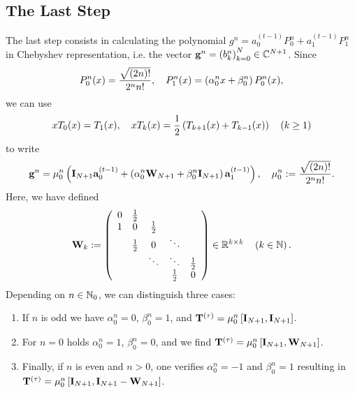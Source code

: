 \subsection{The Last Step}
\label{NFSFT:LinearAlgebra:LastStep}
The last step consists in calculating the polynomial $g^{n} = a_{0}^{(t-1)} P_{0}^{n} + a_{1}^{(t-1)} P_{1}^{n}$ in 
Chebyshev representation, i.e. the vector $\mathbf{g}^{n} = \left(b_{k}^n\right)_{k=0}^{N} \in \mathbb{C}^{N+1}$. Since 
\[
  P_{0}^n{\hspace{-0.4ex}}\left(x\right) = \frac{\sqrt{(2n)!}}{2^n n!},\quad P_{1}^n{\hspace{-0.4ex}}\left(x\right) = \left(\alpha_{0}^n x + \beta_{0}^n\right)P_{0}^n(x),
\] 
we can use 
\[
  xT_{0}(x) = T_{1}(x),\quad xT_{k}(x) = \frac{1}{2}\left( T_{k+1}(x) + T_{k-1}(x) \right) \quad \left(k \ge 1\right)
\] 
to write
\[ 
  \mathbf{g}^{n} = \mu_{0}^n \left( \mathbf{I}_{N+1} \mathbf{a}_{0}^{(t-1)} + \left( \alpha_{0}^n\mathbf{W}_{N+1} + \beta_{0}^n\mathbf{I}_{N+1} \right) 
  \mathbf{a}_{1}^{(t-1)} \right), \quad \mu_{0}^n := \frac{\sqrt{(2n)!}}{2^n n!}.
\]
Here, we have defined
\[
\mathbf{W}_{k} :=
\left(
\begin{array}{ccccccc}
  0 & \frac{1}{2} &             &                           \\
  1 &           0 & \frac{1}{2} &                           \\
    & \frac{1}{2} &           0 & \ddots                    \\
    &             &      \ddots & \ddots      & \frac{1}{2} \\
    &             &             & \frac{1}{2} &           0
\end{array}
\right)
\in \mathbb{R}^{k \times k} \quad \left(k \in \mathbb{N}\right).
\]
Depending on $n \in \mathbb{N}_{0}$, we can distinguish three cases:
\begin{enumerate}
  \item If $n$ is odd we have  $\alpha_{0}^n = 0$, $\beta_{0}^n = 1$, and $\mathbf{T}^{(\tau)} = 
  \mu_{0}^n \left[ \mathbf{I}_{N+1}, \mathbf{I}_{N+1} \right]$.
  \item  For $n = 0$ holds $\alpha_{0}^n = 1$, $\beta_{0}^n = 0$, and we find $\mathbf{T}^{(\tau)} = 
  \mu_{0}^n \left[ \mathbf{I}_{N+1}, \mathbf{W}_{N+1} \right]$.
  \item Finally, if $n$ is even and $n > 0$, one verifies $\alpha_{0}^n = -1$ and $\beta_{0}^n = 1$ resulting 
  in $\mathbf{T}^{(\tau)} = \mu_{0}^n \left[ \mathbf{I}_{N+1}, \mathbf{I}_{N+1} - \mathbf{W}_{N+1} \right]$.
\end{enumerate}

